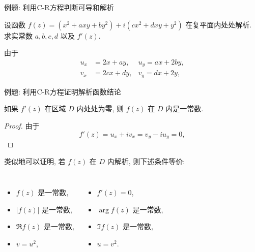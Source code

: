 \begin{frame}{例题: 利用C-R方程判断可导和解析}
\beqskip{4pt}
\onslide<+->
\begin{example}
设函数 $f(z)=(x^2+axy+by^2)+i(cx^2+dxy+y^2)$ 在复平面内处处解析. 求实常数 $a,b,c,d$ 以及 $f'(z)$.
\end{example}
\onslide<+->
\begin{solution}
由于
\begin{align*}
u_x&=2x+ay,&u_y=ax+2by,\\
v_x&=2cx+dy,&v_y=dx+2y,
\end{align*}
\vspace{-\baselineskip}
\onslide<+->{\[a=d=2,\quad b=c=-1,\]}
\vspace{-\baselineskip}
\onslide<+->{\[f'(z)=u_x+iv_x=2x+2y+i(-2x+2y)=(2-2i)z.\]}
\end{solution}
\endgroup
\end{frame}


\begin{frame}[<*>]{例题: 利用C-R方程证明解析函数结论}
\onslide<+->
\begin{example}
如果 $f'(z)$ 在区域 $D$ 内处处为零, 则 $f(z)$ 在 $D$ 内是一常数.
\end{example}
\onslide<+->
\begin{proof}
由于
\vspace{-\baselineskip}
\[f'(z)=u_x+iv_x=v_y-iu_y=0,\]
\end{proof}
\onslide<+->
类似地可以证明, 若 $f(z)$ 在 $D$ 内解析, 则下述条件等价:
\onslide<+->
\begin{columns}
		\begin{itemize}
		\item $f(z)$ 是一常数,
		\item $|f(z)|$ 是一常数,
		\item $\Re{f(z)}$ 是一常数,
		\item $v=u^2$,
		\end{itemize}
		\onslide<+->
		\begin{itemize}
		\item $f'(z)=0$,
		\item $\arg{f(z)}$ 是一常数,
		\item $\Im{f(z)}$ 是一常数,
		\item $u=v^2$.
		\end{itemize}
\end{columns}
\end{frame}


